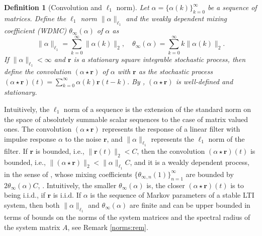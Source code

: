 \documentclass{article}
\newtheorem{definition}[theorem]{Definition}
\newcommand{\bE}{\mathbf{E}}
\begin{document}
\begin{definition}[Convolution and $\ell_1$ norm]
  Let $\alpha=\{\alpha(k)\}_{k=0}^{\infty}$ be a sequence of matrices. 
  Define the $\ell_1$ norm $\|\alpha\|_{\ell_1}$ and 
  the \emph{weakly dependent mixing coefficient (WDMC)} $\theta_{\infty}(\alpha)$ of $\alpha$ as
  \[ \|\alpha\|_{\ell_1}=\sum_{k=0}^{\infty} \|\alpha(k)\|_2, \quad  \theta_{\infty}(\alpha)=\sum_{k=0}^{\infty} k \|\alpha(k)\|_2. \]
  If $\|\alpha\|_{\ell_1} < \infty$ and $\mathbf{r}$ is a stationary square integrable stochastic process, then define the \emph{convolution $(\alpha \star \mathbf{r})$ of $\alpha$ with $\mathbf{r}$}  as the stochastic process
  \( (\alpha \star \mathbf{r})(t)=\sum_{k=0}^{\infty} \alpha(k) \mathbf{r}(t-k) \). 
  By \cite[Theorem 1.1]{CainesBook}, $(\alpha \star \mathbf{r})$ is well-defined and stationary. 
\end{definition}
  Intuitively, the $\ell_1$ norm of a sequence is the extension of the standard norm on the space of
  absolutely summable scalar sequences to the case of matrix valued ones. The convolution 
  $(\alpha \star \mathbf{r})$ represents the response of a linear filter with impulse response $\alpha$
  to the noise $\mathbf{r}$, and $\|\alpha\|_{\ell_1}$ represents the $\ell_1$ norm of the filter.
  If  $\mathbf{r}$ is bounded, i.e., $\|\mathbf{r}(t)\|_2 < C$, then 
  the convolution  $(\alpha \star \mathbf{r})(t)$ is bounded, i.e., $\|(\alpha \star \mathbf{r})\|_2 < \|\alpha\|_{\ell_1} C$, and it is a  weakly dependent process, in the sense of \cite{alquier2012pred},
  whose mixing coefficients $\{\theta_{\infty,n}(1)\}_{n=1}^{\infty}$ 
  are bounded by $2\theta_{\infty}(\alpha)C$, \cite[Proposition 4.12]{alquier2012pred}.
   Intuitively, the smaller $\theta_{\infty}(\alpha)$ is,
  the closer $(\alpha \star \mathbf{r})(t)$ is to being i.i.d., if $\mathbf{r}$ is i.i.d. 
  If $\alpha$ is the sequence of Markov parameters of a stable LTI system, then both $\|\alpha\|_{\ell_1}$ and $\theta_{\infty}(\alpha)$ are finite and can be upper bounded in terms of bounds on the norms of the system matrices and the spectral radius of the system matrix $A$, see Remark \ref{norms:rem}.
\end{document}

